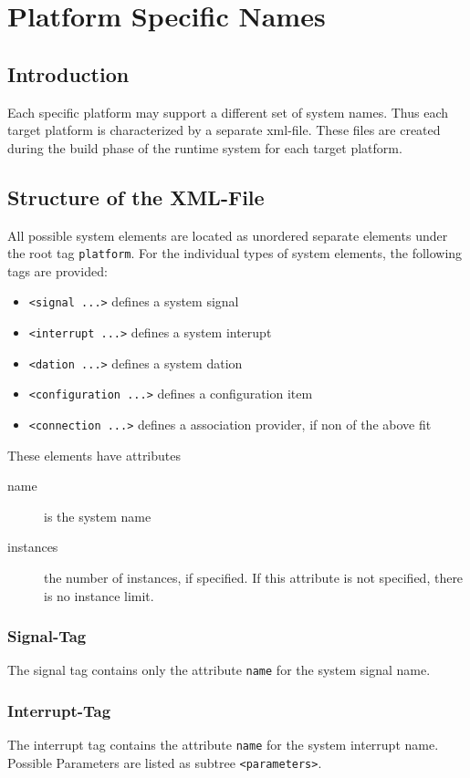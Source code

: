 \chapter{Platform Specific Names}

\section{Introduction}
Each specific platform may support a different set of system names.
Thus each target platform is characterized by a separate xml-file.
These files are created during the build phase of the runtime system
for each target platform.

\section{Structure of the XML-File}
All possible system elements are located as unordered separate 
elements under the root tag \verb|platform|.
For the individual types of system elements, the following tags are
provided:
\begin{itemize}
\item \verb|<signal ...>| defines a system signal
\item \verb|<interrupt ...>| defines a system interupt
\item \verb|<dation ...>| defines a system dation
\item \verb|<configuration ...>| defines a configuration item
\item \verb|<connection ...>| defines a association provider, if 
   non of the above fit
\end{itemize}

These elements have attributes 
\begin{description}
\item [name] is the system name
\item [instances] the number of instances, if specified. If this attribute 
   is not specified, there is no instance limit.
\end{description}

\subsection{Signal-Tag}
The signal tag contains only the attribute \verb|name| for the
system signal name.

\subsection{Interrupt-Tag}
The interrupt tag contains the attribute \verb|name| for the
system interrupt name.
Possible Parameters are listed as subtree \verb|<parameters>|.

